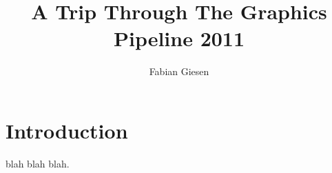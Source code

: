 \documentclass{scrreprt}
\begin{document}


\title{A Trip Through The Graphics Pipeline 2011}
\author{Fabian Giesen}
\maketitle
\tableofcontents

\chapter{Introduction}
blah blah blah.


\end{document}
